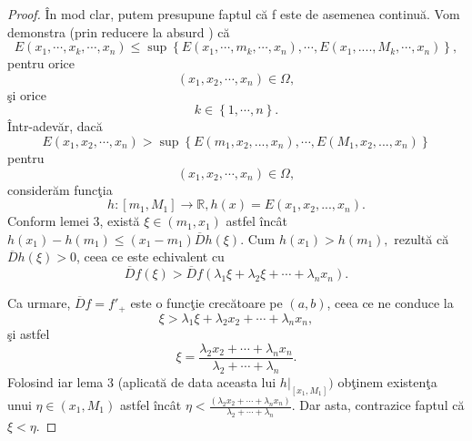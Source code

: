 \documentclass[a4paper,12pt,oneside]{report}
\begin{document}
\begin{proof}
\^{I}n mod clar, putem presupune faptul c\u{a} f este de asemenea continu\u{a}. Vom demonstra (prin reducere la absurd ) c\u{a}
\begin{displaymath}
  E \left ( x_{1},\cdots, x_{k},\cdots, x_{n} \right ) \leq  \sup \left \{ E\left ( x_{1},\cdots, m_{k},\cdots, x_{n} \right ),\cdots, E\left ( x_{1},....,M_{k},\cdots, x_{n} \right ) \right \},
\end{displaymath}
 pentru orice
\begin{displaymath}
     \left ( x_{1}, x_{2},\cdots, x_{n} \right ) \in\Omega,
\end{displaymath}
\c{s}i orice
\begin{displaymath}
    k \in\left \{ 1,\cdots, n \right \}.
\end{displaymath}
 \^{I}ntr-adev\u{a}r, dac\u{a}
\begin{displaymath}
   E  \left ( x_{1}, x_{2},\cdots, x_{n} \right )  >  \sup \left \{ E\left ( m_{1}, x_{2} ,..., x_{n}\right ),\cdots, E\left ( M_{1}, x_{2} ,..., x_{n}\right )  \right \}
\end{displaymath}
pentru
\begin{displaymath}
  \left ( x_{1}, x_{2},\cdots, x_{n} \right ) \in \Omega,
\end{displaymath}
consider\u{a}m func\c{t}ia
\begin{displaymath}
  h : \left [ m_{1}, M_{1} \right ] \rightarrow \mathbb{R}, h\left ( x \right ) = E\left ( x_{1}, x_{2},...,x_{n} \right ).
\end{displaymath}
Conform lemei 3, exist\u{a} \(\xi \in \left ( m_{1}, x_{1} \right )\) astfel \^{i}nc\^{a}t \(h \left ( x_{1} \right ) - h\left ( m_{1} \right ) \leq  \left ( x_{1} - m_{1} \right )\overline{D}h\left ( \xi  \right ).\)
Cum \(h \left ( x_{1} \right ) >  h\left ( m_{1} \right ),\) rezult\u{a} c\u{a} \(\overline{D}h\left ( \xi  \right ) > 0\), ceea ce este echivalent cu
\begin{displaymath}
   \overline{D}f\left ( \xi  \right ) > \overline{D}f\left (\lambda _{1}\xi +\lambda _{2}\xi +\cdots +\lambda _{n} x_{n} \right ).
\end{displaymath}

Ca urmare, \(\overline{D}f = {f}'_{+}\) este o func\c{t}ie crec\u{a}toare pe \(\left ( a,b \right )\), ceea ce ne conduce la
\begin{displaymath}
   \xi > \lambda _{1}\xi +\lambda _{2}x_{2} + \cdots +\lambda _{n}x_{n},
\end{displaymath}
\c{s}i astfel
\begin{displaymath}
    \xi = \frac{\lambda _{2}x_{2} + \cdots +\lambda _{n}x_{n}}{\lambda _{2}+\cdots +\lambda _{n}}.
\end{displaymath}
Folosind iar lema 3 (aplicat\u{a} de data aceasta lui \(h|_{\left [ x_{1},M_{1} \right ]})\) ob\c{t}inem  existen\c{t}a unui \(\eta \in \left ( x_{1} , M_{1}\right )\) astfel \^{i}nc\^{a}t \(\eta < \frac{\left ( \lambda _{2}x_{2}+\cdots +\lambda _{n}x_{n} \right )}{\lambda _{2}+\cdots +\lambda _{n}}\). Dar asta, contrazice faptul c\u{a} \(\xi <  \eta \).
\end{proof}
\end{document}
